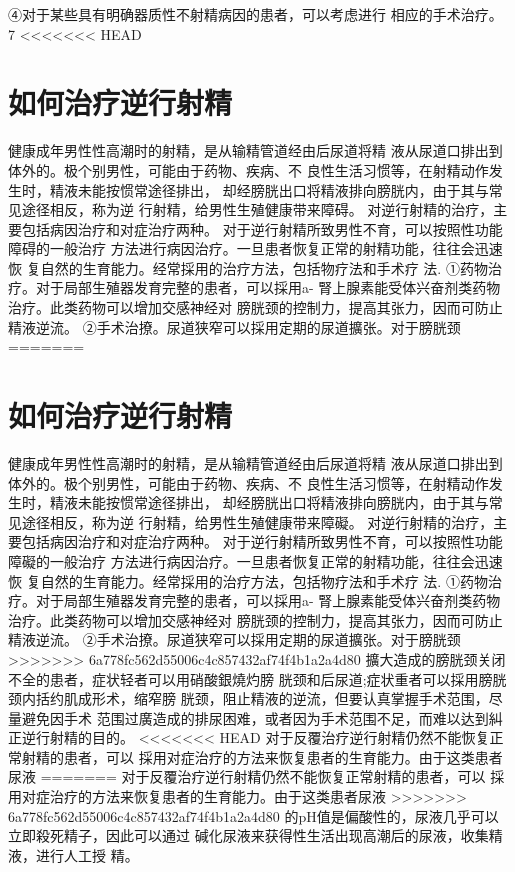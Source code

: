\documentclass[12pt,UTF8]{ctexbook}
\begin{document}
④对于某些具有明确器质性不射精病因的患者，可以考虑进行
相应的手术治疗。
7
<<<<<<< HEAD
\section{如何治疗逆行射精}
健康成年男性性高潮时的射精，是从输精管道经由后尿道将精
液从尿道口排出到体外的。极个别男性，可能由于药物、疾病、不
良性生活习惯等，在射精动作发生时，精液未能按惯常途径排出，
却经膀胱出口将精液排向膀胱内，由于其与常见途径相反，称为逆
行射精，给男性生殖健康带来障碍。
对逆行射精的治疗，主要包括病因治疗和对症治疗两种。
对于逆行射精所致男性不育，可以按照性功能障碍的一般治疗
方法进行病因治疗。一旦患者恢复正常的射精功能，往往会迅速恢
复自然的生育能力。经常採用的治疗方法，包括物疗法和手术疗
法.
①药物治疗。对于局部生殖器发育完整的患者，可以採用a-
腎上腺素能受体兴奋剂类药物治疗。此类药物可以增加交感神经对
膀胱颈的控制力，提高其张力，因而可防止精液逆流。
②手术治撩。尿道狭窄可以採用定期的尿道擴张。对于膀胱颈
=======
\section{如何治疗逆行射精}
健康成年男性性高潮时的射精，是从输精管道经由后尿道将精
液从尿道口排出到体外的。极个别男性，可能由于药物、疾病、不
良性生活习惯等，在射精动作发生时，精液未能按惯常途径排出，
却经膀胱出口将精液排向膀胱内，由于其与常见途径相反，称为逆
行射精，给男性生殖健康带来障礙。
对逆行射精的治疗，主要包括病因治疗和对症治疗两种。
对于逆行射精所致男性不育，可以按照性功能障礙的一般治疗
方法进行病因治疗。一旦患者恢复正常的射精功能，往往会迅速恢
复自然的生育能力。经常採用的治疗方法，包括物疗法和手术疗
法.
①药物治疗。对于局部生殖器发育完整的患者，可以採用a-
腎上腺素能受体兴奋剂类药物治疗。此类药物可以增加交感神经对
膀胱颈的控制力，提高其张力，因而可防止精液逆流。
②手术治撩。尿道狭窄可以採用定期的尿道擴张。对于膀胱颈
>>>>>>> 6a778fc562d55006c4c857432af74f4b1a2a4d80
擴大造成的膀胱颈关闭不全的患者，症状轻者可以用硝酸銀燒灼膀
胱颈和后尿道;症状重者可以採用膀胱颈内括约肌成形术，缩窄膀
胱颈，阻止精液的逆流，但要认真掌握手术范围，尽量避免因手术
范围过廣造成的排尿困难，或者因为手术范围不足，而难以达到糾
正逆行射精的目的。
<<<<<<< HEAD
对于反覆治疗逆行射精仍然不能恢复正常射精的患者，可以
採用对症治疗的方法来恢复患者的生育能力。由于这类患者尿液
=======
对于反覆治疗逆行射精仍然不能恢复正常射精的患者，可以
採用对症治疗的方法来恢复患者的生育能力。由于这类患者尿液
>>>>>>> 6a778fc562d55006c4c857432af74f4b1a2a4d80
的pH值是偏酸性的，尿液几乎可以立即殺死精子，因此可以通过
碱化尿液来获得性生活出现高潮后的尿液，收集精液，进行人工授
精。
\end{document}
